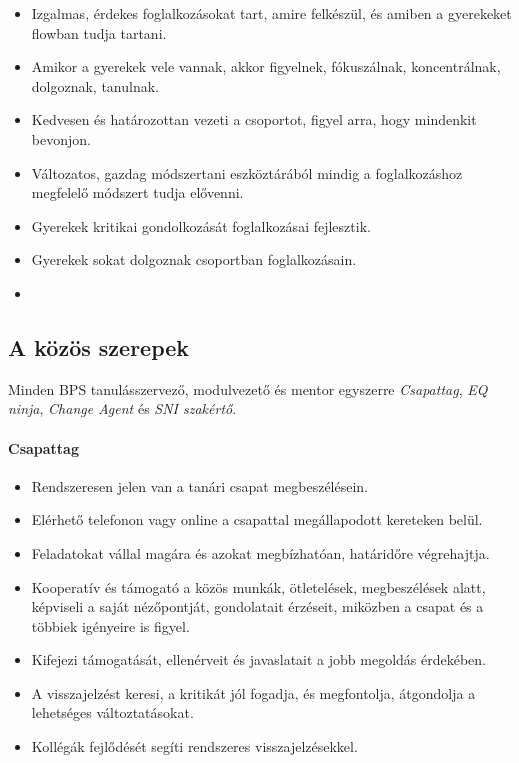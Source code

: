 \begin{itemize}

    \item
          Izgalmas, érdekes foglalkozásokat tart, amire felkészül, és amiben a gyerekeket flowban tudja tartani.
    \item
          Amikor a gyerekek vele vannak, akkor figyelnek, fókuszálnak, koncentrálnak, dolgoznak, tanulnak.
    \item
          Kedvesen és határozottan vezeti a csoportot, figyel arra, hogy mindenkit bevonjon.
    \item Változatos, gazdag módszertani eszköztárából mindig a foglalkozáshoz megfelelő módszert tudja elővenni.
    \item  Gyerekek kritikai gondolkozását foglalkozásai fejlesztik.
    \item Gyerekek sokat dolgoznak csoportban foglalkozásain.
    \item
\end{itemize}

\subsection{A közös szerepek}

Minden BPS tanulásszervező, modulvezető és mentor egyszerre  \emph{Csapattag}, \emph{EQ ninja}, \emph{Change Agent} és \emph{SNI szakértő}. 

\paragraph{Csapattag}

\begin{itemize}

    \item
          Rendszeresen jelen van a tanári csapat megbeszélésein.
    \item
          Elérhető telefonon vagy online a csapattal megállapodott kereteken belül.
    \item
          Feladatokat vállal magára és azokat megbízhatóan, határidőre végrehajtja.
    \item
          Kooperatív és támogató a közös munkák, ötletelések, megbeszélések alatt, képviseli a saját nézőpontját, gondolatait érzéseit, miközben a csapat és a többiek igényeire is figyel.
    \item
          Kifejezi támogatását, ellenérveit és javaslatait a jobb megoldás érdekében.
    \item
          A visszajelzést keresi, a kritikát jól fogadja, és megfontolja, átgondolja a lehetséges változtatásokat.
    \item
          Kollégák fejlődését segíti rendszeres visszajelzésekkel.
\end{itemize}


